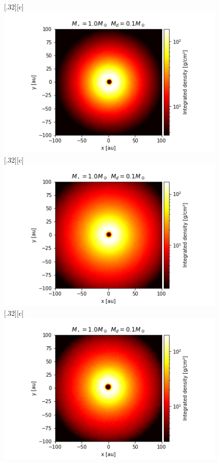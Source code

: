 \documentclass[aps,prb,twocolumn,superscriptaddress,floatfix,longbibliography]{revtex4-2}
\begin{document}
\begin{appendices}
\begin{figure}[!htbp]
  \subcaptionbox*{}[.32\linewidth][c]{%
    \includegraphics[width=\linewidth]{Graphs_2D/r_1s_0.1d_0.3q_2D.png}}\quad
  \subcaptionbox*{}[.32\linewidth][c]{%
    \includegraphics[width=\linewidth]{Graphs_2D/r_1s_0.1d_0.5q_2D.png}}\quad
  \subcaptionbox*{}[.32\linewidth][c]{%
    \includegraphics[width=\linewidth]{Graphs_2D/r_1s_0.1d_0.7q_2D.png}}\quad

\end{figure}
\end{appendices}
\end{document}
